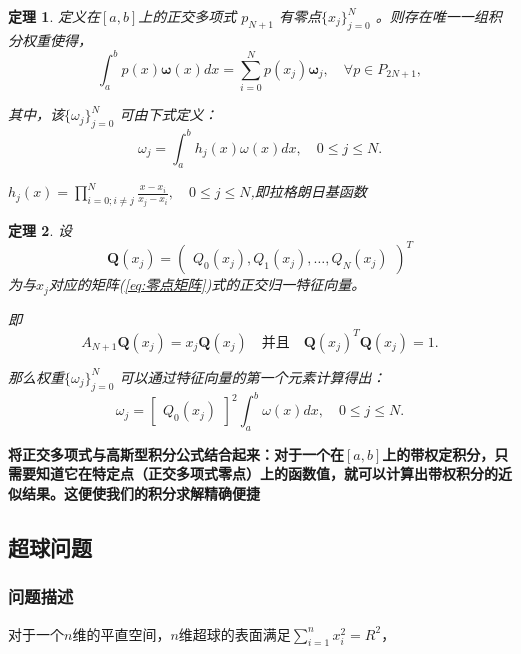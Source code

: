 \documentclass[12pt]{ctexart}
\numberwithin{equation}{section} %
\newtheorem{theorem}{定理}[section]
\begin{document}
\begin{theorem}
    定义在$[a,b]$上的正交多项式  $p_{N+1}$  有零点$\{x_j\}_{j=0}^N$ 。则存在唯一一组积分权重使得，
\begin{equation}
\int_a^bp(x)\boldsymbol{\omega}(x)dx=\sum_{i=0}^Np(x_j)\boldsymbol{\omega}_j,\quad\forall p\in P_{2N+1},
\end{equation}

其中，该$\{\omega_j\}_{j=0}^N$ 可由下式定义：
\begin{equation}
    \omega_j=\int_a^bh_j(x)\omega(x)dx,\quad0\leq j\leq N.
\label{eq:积分权重}
\end{equation}

$ h_j(x)=\prod_{i=0;i\neq j}^N\frac{x-x_i}{x_j-x_i},\quad0\leq j\leq N$,即拉格朗日基函数
\label{theorem:多项式积分定理}
\end{theorem}
\begin{theorem}
    

设
\begin{equation}
    \mathbf{Q}(x_j)=\begin{pmatrix}Q_0(x_j),Q_1(x_j),\ldots,Q_N(x_j)\end{pmatrix}^T
\end{equation} 
为与$x_j$对应的矩阵(\ref{eq:零点矩阵})式的正交归一特征向量。

 即
 \begin{equation}
    A_{N+1}\mathbf{Q}(x_j)=x_j\mathbf{Q}(x_j)\quad \text{并且}\quad\mathbf{Q}(x_j)^T\mathbf{Q}(x_j)=1.
\end{equation}
    
那么权重$\{\omega_j\}_{j=0}^{N}$ 可以通过特征向量的第一个元素计算得出：
\begin{equation}
    \omega_j=\begin{bmatrix}Q_0(x_j)\end{bmatrix}^2\int_a^b\omega(x)dx,\quad0\leq j\leq N.
\end{equation}
\label{theorem:特征向量积分权重}
\end{theorem}
\textbf{
将正交多项式与高斯型积分公式结合起来：对于一个在$[a,b]$上的带权定积分，只需要知道它在特定点（正交多项式零点）上的函数值，就可以计算出带权积分的近似结果。这便使我们的积分求解精确便捷}
\subsection{超球问题}
\subsubsection{问题描述}
对于一个$n$维的平直空间，$n$维超球的表面满足$\sum ^n_{i=1}x_i^2=R^2$，
\end{document}
